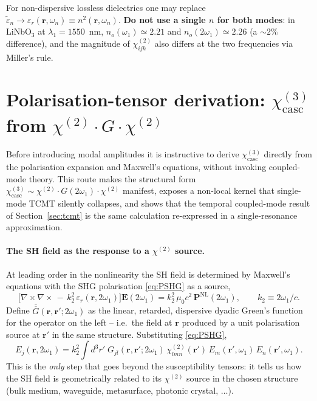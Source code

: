 \documentclass[11pt,a4paper]{article}
\newcommand{\eps}{\varepsilon}
\newcommand{\epstilde}{\widetilde{\varepsilon}}
\newcommand{\bvec}[1]{\mathbf{#1}}
\newcommand{\ri}{\bvec{r}}
\newcommand{\chitwo}{\chi^{(2)}}
\newcommand{\chithree}{\chi^{(3)}}
\begin{document}
For non-dispersive lossless dielectrics one may replace
$\epstilde_n\to\eps_r(\ri,\omega_n)\equiv n^2(\ri,\omega_n)$.
\textbf{Do not use a single $n$ for both modes}: in LiNbO$_3$ at
$\lambda_1=1550$~nm, $n_o(\omega_1)\simeq 2.21$ and $n_o(2\omega_1)\simeq 2.26$
(a $\sim 2\%$ difference), and the magnitude of $\chitwo_{ijk}$ also
differs at the two frequencies via Miller's rule.

\section{Polarisation-tensor derivation: $\chithree_{\text{casc}}$ from $\chitwo\!\cdot G\!\cdot\chitwo$}\label{sec:tensorder}

Before introducing modal amplitudes it is instructive to derive
$\chithree_{\text{casc}}$ directly from the polarisation expansion and
Maxwell's equations, without invoking coupled-mode theory.  This route
makes the structural form
$\chithree_{\text{casc}}\sim\chitwo\!\cdot G(2\omega_1)\!\cdot\chitwo$
manifest, exposes a non-local kernel that single-mode TCMT silently
collapses, and shows that the temporal coupled-mode result of
Section~\ref{sec:tcmt} is the same calculation re-expressed in a
single-resonance approximation.

\paragraph{The SH field as the response to a $\chitwo$ source.}
At leading order in the nonlinearity the SH field is determined by
Maxwell's equations with the SHG polarisation \eqref{eq:PSHG} as a
source,
\begin{equation}
  \bigl[\nabla\!\times\!\nabla\!\times\,-\,k_2^2\,\eps_r(\ri,2\omega_1)\bigr]
  \mathbf E(2\omega_1)=k_2^2\,\mu_0 c^2\,\mathbf P^{\text{NL}}(2\omega_1),
  \qquad k_2\equiv 2\omega_1/c.
\label{eq:waveeq-SH}
\end{equation}
Define $\overline{\overline G}(\ri,\ri';2\omega_1)$ as the linear,
retarded, dispersive dyadic Green's function for the operator on the
left -- i.e.\ the field at $\ri$ produced by a unit polarisation source
at $\ri'$ in the same structure.  Substituting \eqref{eq:PSHG},
\begin{equation}
  \boxed{\;
    E_j(\ri,2\omega_1)
    = k_2^2\!\int\!d^3r'\;
      G_{jl}(\ri,\ri';2\omega_1)\,\chitwo_{lmn}(\ri')\,
      E_m(\ri',\omega_1)\,E_n(\ri',\omega_1).
  \;}
  \label{eq:Esh-Green}
\end{equation}
This is the \emph{only} step that goes beyond the susceptibility
tensors: it tells us how the SH field is geometrically related to its
$\chitwo$ source in the chosen structure (bulk medium, waveguide,
metasurface, photonic crystal, $\ldots$).
\end{document}

